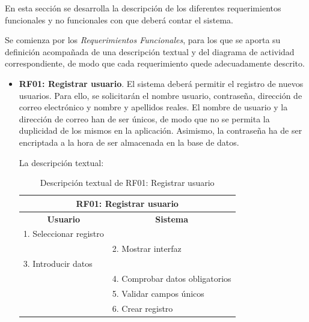 En esta sección se desarrolla la descripción de los diferentes requerimientos funcionales y no funcionales con que deberá contar el sistema. 

Se comienza por los \emph{Requerimientos Funcionales}, para los que se aporta su definición acompañada de una descripción textual y del diagrama de actividad correspondiente, de modo que cada requerimiento quede adecuadamente descrito.

\begin{itemize}
	\item \textbf{RF01: Registrar usuario}. El sistema deberá permitir el registro de nuevos usuarios. Para ello, se solicitarán el nombre usuario, contraseña, dirección de correo electrónico y nombre y apellidos reales. El nombre de usuario y la dirección de correo han de ser únicos, de modo que no se permita la duplicidad de los mismos en la aplicación. Asimismo, la contraseña ha de ser encriptada a la hora de ser almacenada en la base de datos.
	
	La descripción textual:
	\begin{table}[h]
		\centering	
		\begin{tabular}{|l|l|}
			\hline
			\multicolumn{2}{|c|}{\textbf{RF01: Registrar usuario}} \\ \hline
			\multicolumn{1}{|c|}{\textbf{Usuario}} & \multicolumn{1}{c|}{\textbf{Sistema}} \\ \hline
			1. Seleccionar registro &\\ \hline
			& 2. Mostrar interfaz \\ \hline
			3. Introducir datos &\\ \hline
			& 4. Comprobar datos obligatorios \\ \hline
			& 5. Validar campos únicos\\ \hline
			& 6. Crear registro \\ \hline
		\end{tabular}
		\caption{Descripción textual de RF01: Registrar usuario}
		\label{tab:tablaDescTextualRF01}
	\end{table}
	

\end{itemize}
